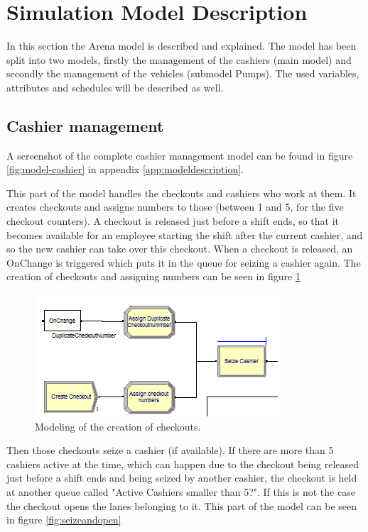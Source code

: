 \section{Simulation Model Description}

In this section the Arena model is described and explained. The model has been split into two models, firstly the management of the cashiers (main model) and secondly the management of the vehicles (submodel Pumps). The used variables, attributes and schedules will be described as well.

\subsection{Cashier management}
A screenshot of the complete cashier management model can be found in figure \ref{fig:model-cashier} in appendix \ref{app:modeldescription}.

This part of the model handles the checkouts and cashiers who work at them. It creates checkouts and assigns numbers to those (between 1 and 5, for the five checkout counters). A checkout is released just before a shift ends, so that it becomes available for an employee starting the shift after the current cashier, and so the new cashier can take over this checkout. When a checkout is released, an OnChange is triggered which puts it in the queue for seizing a cashier again. The creation of checkouts and assigning numbers can be seen in figure \ref{fig:createcheckouts}

\begin{figure}[h!]
	\includegraphics[scale=1]{images/model-description/checkout-creation.PNG}
	\caption{Modeling of the creation of checkouts.}
	\label{fig:createcheckouts}
\end{figure}

Then those checkouts seize a cashier (if available). If there are more than 5 cashiers active at the time, which can happen due to the checkout being released just before a shift ends and being seized by another cashier, the checkout is held at another queue called "Active Cashiers smaller than 5?". If this is not the case the checkout opens the lanes belonging to it. This part of the model can be seen in figure \ref{fig:seizeandopen}

